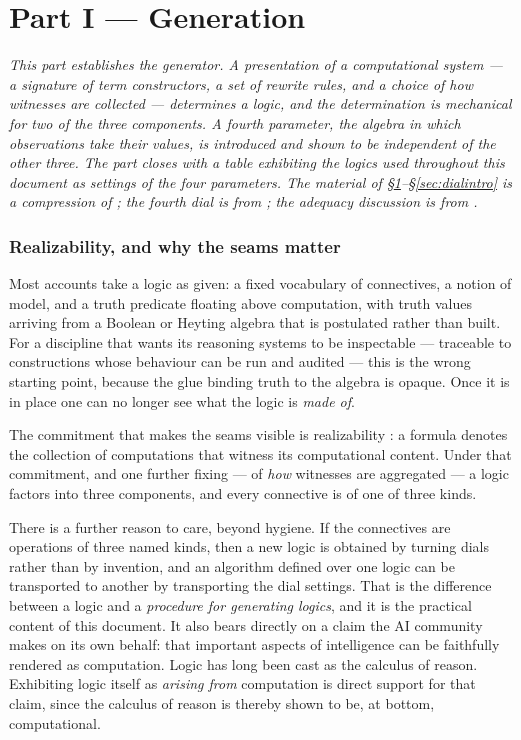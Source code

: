 \part*{Part I --- Generation}
\renewcommand{\thesection}{\arabic{section}}
\setcounter{section}{0}
\setcounter{definition}{0}

\bigskip
\noindent
\emph{This part establishes the generator. A presentation of a computational
system --- a signature of term constructors, a set of rewrite rules, and a choice
of how witnesses are collected --- determines a logic, and the determination is
mechanical for two of the three components. A fourth parameter, the algebra in
which observations take their values, is introduced and shown to be independent of
the other three. The part closes with a table exhibiting the logics used
throughout this document as settings of the four parameters. The material of
\S\ref{sec:realizability}--\S\ref{sec:dialintro} is a compression of
\cite{Zeus}; the fourth dial is from \cite{GradedWhere,WeightedGSLT}; the
adequacy discussion is from \cite{GsltOmnibus}.}
\bigskip

\section{Realizability, and why the seams matter}
\label{sec:realizability}

Most accounts take a logic as given: a fixed vocabulary of connectives, a notion
of model, and a truth predicate floating above computation, with truth values
arriving from a Boolean or Heyting algebra that is postulated rather than built.
For a discipline that wants its reasoning systems to be inspectable --- traceable
to constructions whose behaviour can be run and audited --- this is the wrong
starting point, because the glue binding truth to the algebra is opaque. Once it
is in place one can no longer see what the logic is \emph{made of}.

The commitment that makes the seams visible is realizability \cite{Kleene45,
vanOosten08}: a formula denotes the collection of computations that witness its
computational content. Under that commitment, and one further fixing --- of
\emph{how} witnesses are aggregated --- a logic factors into three components, and
every connective is of one of three kinds.

There is a further reason to care, beyond hygiene. If the connectives are
operations of three named kinds, then a new logic is obtained by turning dials
rather than by invention, and an algorithm defined over one logic can be
transported to another by transporting the dial settings. That is the difference
between a logic and a \emph{procedure for generating logics}, and it is the
practical content of this document. It also bears directly on a claim the AI
community makes on its own behalf: that important aspects of intelligence can be
faithfully rendered as computation. Logic has long been cast as the calculus of
reason. Exhibiting logic itself as \emph{arising from} computation is direct
support for that claim, since the calculus of reason is thereby shown to be, at
bottom, computational.

